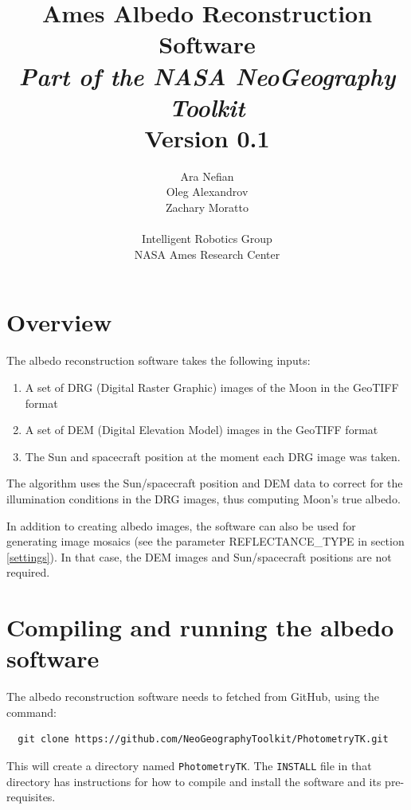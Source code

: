 \documentclass[letterpaper,fleqn,11pt]{report}
\title{{\Huge Ames Albedo Reconstruction Software}\\
{\em Part of the NASA NeoGeography Toolkit}\\
Version 0.1}
\author{
Ara Nefian\\
Oleg Alexandrov\\
Zachary Moratto\\
\\
Intelligent Robotics Group\\
NASA Ames Research Center\\
}
\begin{document}
\maketitle
%
\tableofcontents



\newpage

\section{Overview}\label{overview}

The albedo reconstruction software takes the following inputs:
\begin{enumerate}
\item A set of DRG (Digital Raster Graphic) images of the Moon in the GeoTIFF format
\item A set of DEM (Digital Elevation Model) images in the GeoTIFF format
\item The Sun and spacecraft position at the moment each DRG image was
  taken. 
\end{enumerate}

The algorithm uses the Sun/spacecraft position and DEM data to
correct for the illumination conditions in the DRG images, thus
computing Moon's true albedo. 

In addition to creating albedo images, the software can also be used
for generating image mosaics (see the parameter REFLECTANCE\_TYPE in
section \ref{settings}). In that case, the DEM images and Sun/spacecraft positions are
not required.

\section{Compiling and running the albedo software}

The albedo reconstruction software needs to fetched from GitHub, using
the command:

\begin{verbatim}
  git clone https://github.com/NeoGeographyToolkit/PhotometryTK.git
\end{verbatim}
 
This will create a directory named \texttt{PhotometryTK}. The
\texttt{INSTALL} file in that directory has instructions for how to
compile and install the software and its pre-requisites.
\end{document}
